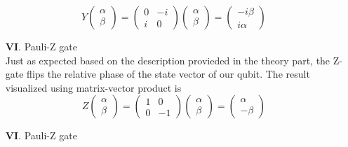 \documentclass[onecolumn,10pt,cleanfoot]{asme2ej}
\begin{document}
\begin{enumerate}
				\[
				Y \begin{pmatrix}
				\alpha \\
				\beta
				\end{pmatrix}
				=
				\begin{pmatrix}
				0 & -i \\
				i & 0
				\end{pmatrix}
				\begin{pmatrix}
				\alpha \\
				\beta
				\end{pmatrix}
				=
				\begin{pmatrix}
				-i\beta \\
				i\alpha
				\end{pmatrix}
				\] 	
			\item[\textbf{VI}. ] Pauli-Z gate \\
				Just as expected based on the description provieded in the theory part, the Z-gate flips the relative phase of the state vector of our qubit. The result visualized using matrix-vector product is
				\[
				Z \begin{pmatrix}
				\alpha \\
				\beta
				\end{pmatrix}
				=
				\begin{pmatrix}
				1 & 0 \\
				0 & -1
				\end{pmatrix}
				\begin{pmatrix}
				\alpha \\
				\beta
				\end{pmatrix}
				=
				\begin{pmatrix}
				\alpha \\
				-\beta
				\end{pmatrix}
				\]
			\item[\textbf{VI}. ] Pauli-Z gate \\





			

		\end{enumerate}
\end{document}
